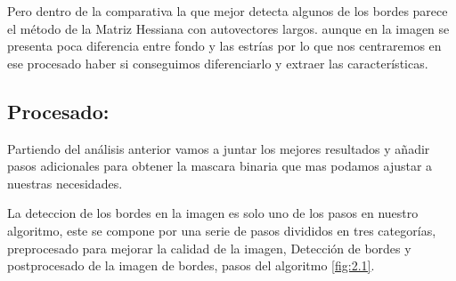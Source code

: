 Pero dentro de la comparativa la que mejor detecta algunos de los bordes parece el método de la Matriz Hessiana con autovectores largos. aunque en la imagen se presenta poca diferencia entre fondo y las estrías por lo que nos centraremos en ese procesado haber si conseguimos diferenciarlo y extraer las características.

\subsection{Procesado:}
Partiendo del análisis anterior vamos a juntar los mejores resultados y añadir pasos adicionales para obtener la mascara binaria que mas podamos ajustar a nuestras necesidades.

La deteccion de los bordes en la imagen es solo uno de los pasos en nuestro algoritmo, este se compone por una serie de pasos divididos en tres categorías, preprocesado para mejorar la calidad de la imagen, Detección de bordes y postprocesado de la imagen de bordes, pasos del algoritmo \ref{fig:2.1}.

